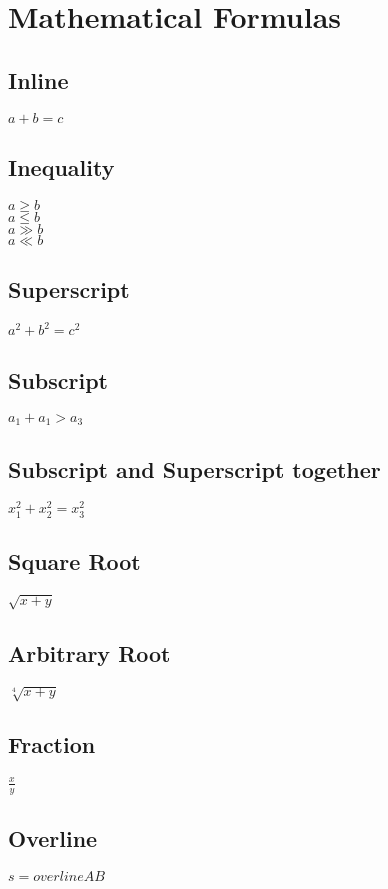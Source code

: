 

\section{Mathematical Formulas}

\subsection{Inline}
$a + b = c$

\subsection{Inequality}
$a \geq b$ \\
$a \leq b$  \\
$a \gg b$   \\
$a \ll b$ 

\subsection{Superscript}
$a^2 + b^2 = c^2$

\subsection{Subscript}
$a_1 + a_1 > a_3$

\subsection{Subscript and Superscript together}
$x_1^2 + x_2^2 = x_3^2$

\subsection{Square Root}
$\sqrt{x + y}$

\subsection{Arbitrary Root}
$\sqrt[4]{x+y}$

\subsection{Fraction}
$\frac{x}{y}$


\subsection{Overline}
\begin{math}
	s = overline{AB}
\end{math}

